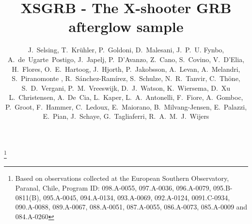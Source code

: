 \documentclass{aa}    %
\begin{document}
	
\title{\vspace{-0.5cm} XSGRB - The X-shooter GRB afterglow sample}
\thanks{Based on observations collected at the European Southern Observatory, Paranal, 
	Chile, Program ID: 098.A-0055, 097.A-0036, 096.A-0079, 095.B-0811(B), 
	095.A-0045, 094.A-0134, 093.A-0069, 092.A-0124, 0091.C-0934, 090.A-0088,
	089.A-0067, 088.A-0051, 087.A-0055, 086.A-0073, 085.A-0009 and 084.A-0260}


\author{
	J.~Selsing, 
	T.~Kr\"{u}hler, 
	P.~Goldoni, 
	D.~Malesani, 
	J.~P.~U. Fynbo, 
	A.~de~Ugarte~Postigo, 
	J.~Japelj,
	P.~D'Avanzo,
	Z.~Cano,
	S.~Covino, 
	V.~D'Elia, 
	H.~Flores,
	O.~E.~Hartoog,
	J.~Hjorth, 
	P.~Jakobsson, 
	A.~Levan,
	A.~Melandri,
	S.~Piranomonte ,
	R.~S\'anchez-Ram\'irez,
	S.~Schulze, 
	N.~R.~Tanvir,
	C.~Th{\"o}ne,
	S.~D.~Vergani,
	P.~M.~Vreeswijk, 
	D.~J.~Watson,
	K.~Wiersema,
	D.~Xu
	L.~Christensen,
	A.~De~Cia, 
	L.~Kaper, 
	L.~A.~Antonelli,
	F.~Fiore,
	A.~Gomboc,
	P.~Groot,
	F.~Hammer,
	C.~Ledoux, 
	E.~Maiorano,
	B.~Milvang-Jensen, 
	E.~Palazzi,
	E.~Pian,
	J.~Schaye,
	G.~Tagliaferri,
	R.~A.~M.~J.~Wijers
}

\end{document}
